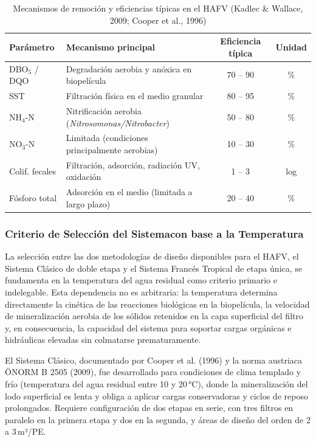 \documentclass[12pt,a4paper]{article}
\begin{document}
\begin{table}[H]
\centering
\caption{Mecanismos de remoción y eficiencias típicas en el HAFV (Kadlec \& Wallace, 2009; Cooper et al., 1996)}
\label{tab:mecanismos_hafv}
\begin{tabular}{p{2.2cm}p{6.5cm}cc}
\toprule
\textbf{Parámetro} & \textbf{Mecanismo principal} & \textbf{Eficiencia típica} & \textbf{Unidad} \\
\midrule
DBO$_5$ / DQO & Degradación aerobia y anóxica en biopelícula & 70 -- 90 & \% \\
SST & Filtración física en el medio granular & 80 -- 95 & \% \\
NH$_4$-N & Nitrificación aerobia (\textit{Nitrosomonas/Nitrobacter}) & 50 -- 80 & \% \\
NO$_3$-N & Limitada (condiciones principalmente aerobias) & 10 -- 30 & \% \\
Colif. fecales & Filtración, adsorción, radiación UV, oxidación & 1 -- 3 & log \\
Fósforo total & Adsorción en el medio (limitada a largo plazo) & 20 -- 40 & \% \\
\bottomrule
\end{tabular}
\end{table}

\subsubsection*{Criterio de Selección del Sistemacon base a la  Temperatura}

La selección entre las dos metodologías de diseño disponibles para el HAFV, el Sistema Clásico de doble etapa y el Sistema Francés Tropical de etapa única, se fundamenta en la temperatura del agua residual como criterio primario e indelegable. Esta dependencia no es arbitraria: la temperatura determina directamente la cinética de las reacciones biológicas en la biopelícula, la velocidad de mineralización aerobia de los sólidos retenidos en la capa superficial del filtro y, en consecuencia, la capacidad del sistema para soportar cargas orgánicas e hidráulicas elevadas sin colmatarse prematuramente.

El Sistema Clásico, documentado por Cooper et al. (1996) y la norma austriaca ÖNORM B 2505 (2009), fue desarrollado para condiciones de clima templado y frío (temperatura del agua residual entre 10 y 20\,°C), donde la mineralización del lodo superficial es lenta y obliga a aplicar cargas conservadoras y ciclos de reposo prolongados. Requiere configuración de dos etapas en serie, con tres filtros en paralelo en la primera etapa y dos en la segunda, y áreas de diseño del orden de 2 a 3\,m²/PE.
\end{document}

